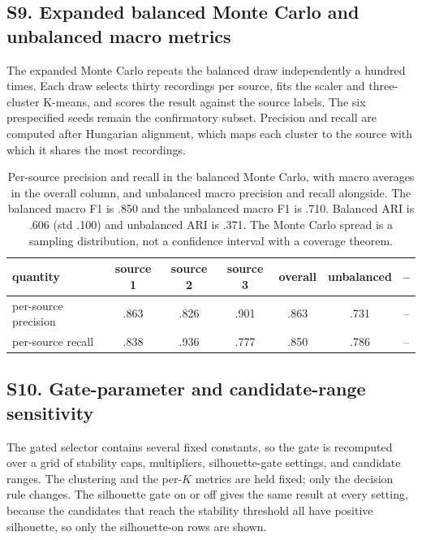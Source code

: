 \subsection{S9. Expanded balanced Monte Carlo and unbalanced macro
metrics}\label{s9.-expanded-balanced-monte-carlo-and-unbalanced-macro-metrics}

The expanded Monte Carlo repeats the balanced draw independently a
hundred times. Each draw selects thirty recordings per source, fits the
scaler and three-cluster K-means, and scores the result against the
source labels. The six prespecified seeds remain the confirmatory
subset. Precision and recall are computed after Hungarian alignment,
which maps each cluster to the source with which it shares the most
recordings.

\begin{table}[H]
\centering
\footnotesize
\caption{Per-source precision and recall in the balanced Monte Carlo, with macro averages in the overall column, and unbalanced macro precision and recall alongside. The balanced macro F1 is .850 and the unbalanced macro F1 is .710. Balanced ARI is .606 (std .100) and unbalanced ARI is .371. The Monte Carlo spread is a sampling distribution, not a confidence interval with a coverage theorem.}
\label{tab:montecarlo-supp}
\begin{tabular}{lcccccc}
\hline
quantity & source 1 & source 2 & source 3 & overall & unbalanced & --\\
\hline
per-source precision & .863 & .826 & .901 & .863 & .731 & --\\
per-source recall & .838 & .936 & .777 & .850 & .786 & --\\
\hline
\end{tabular}

\end{table}

\subsection{S10. Gate-parameter and candidate-range
sensitivity}\label{s10.-gate-parameter-and-candidate-range-sensitivity}

The gated selector contains several fixed constants, so the gate is
recomputed over a grid of stability caps, multipliers, silhouette-gate
settings, and candidate ranges. The clustering and the per-\(K\) metrics
are held fixed; only the decision rule changes. The silhouette gate on
or off gives the same result at every setting, because the candidates
that reach the stability threshold all have positive silhouette, so only
the silhouette-on rows are shown.

